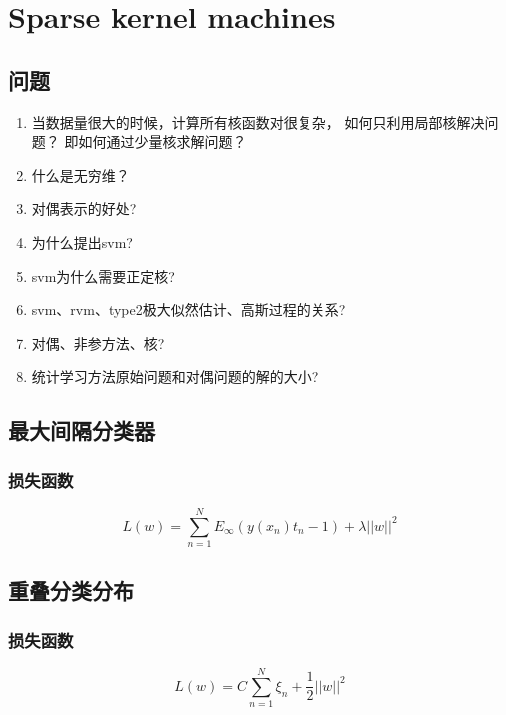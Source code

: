 \chapter{Sparse kernel machines}
\section{问题}
\begin{enumerate}
\item 当数据量很大的时候，计算所有核函数对很复杂，
如何只利用局部核解决问题？ 即如何通过少量核求解问题？
\item 什么是无穷维？
\item 对偶表示的好处?
\item 为什么提出svm?
\item svm为什么需要正定核?
\item svm、rvm、type2极大似然估计、高斯过程的关系?
\item 对偶、非参方法、核?
\item 统计学习方法原始问题和对偶问题的解的大小?
\end{enumerate}

\section{最大间隔分类器}
\subsection{损失函数}
\begin{equation}
L(w) = \sum_{n=1}^N E_\infty(y(x_n)t_n - 1) + \lambda||w||^2
\end{equation}
\section{重叠分类分布}

\subsection{损失函数}
\begin{equation}
L(w) = C\sum_{n=1}^N\xi_n + \frac{1}{2}||w||^2
\end{equation}
